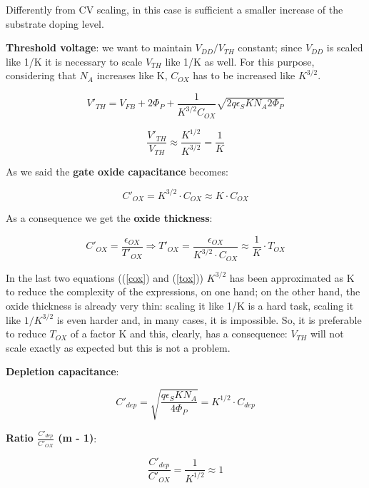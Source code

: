 \documentclass[a4paper, 12pt, twoside, openright]{report}
\begin{document}
Differently from CV scaling, in this case is sufficient a smaller increase of the substrate doping level.

\textbf{Threshold voltage}: we want to maintain $V_{DD}/V_{TH}$ constant; since $V_{DD}$ is scaled like 1/K it is necessary to scale $V_{TH}$ like 1/K as well. For this purpose, considering that $N_{A}$ increases like K, $C_{OX}$ has to be increased like $K^{3/2}$.

	\begin{equation}
	V'_{TH} = V_{FB} + 2\Phi_P + \frac{1}{K^{3/2} C_{OX}} \sqrt{2q \epsilon_S K N_A 2\Phi_P}
	\end{equation}
	
	\begin{equation}
	\frac{V'_{TH}}{V_{TH}} \approx \frac{K^{1/2}} {K^{3/2}} = \frac{1}{K}
	\end{equation}

As we said the \textbf{gate oxide capacitance} becomes:

	\begin{equation}
	C'_{OX} = K^{3/2} \cdot C_{OX}  \approx K \cdot C_{OX}
	\label{cox}
	\end{equation}

As a consequence we get the \textbf{oxide thickness}:

	\begin{equation}
	C'_{OX} = \frac{\epsilon_{OX}}{T'_{OX}} \Rightarrow T'_{OX} = \frac{\epsilon_{OX}}{K^{3/2} \cdot C_{OX}} \approx \frac{1}{K} \cdot T_{OX}
	\label{tox}
	\end{equation}

In the last two equations ((\ref{cox}) and (\ref{tox})) $K^{3/2}$ has been approximated as K to reduce the complexity of the expressions, on one hand; on the other hand, the oxide thickness is already very thin: scaling it like 1/K is a hard task, scaling it like $1/K^{3/2}$ is even harder and, in many cases, it is impossible. So, it is preferable to reduce $T_{OX}$ of a factor K and this, clearly, has a consequence: $V_{TH}$ will not scale exactly as expected but this is not a problem.

\textbf{Depletion capacitance}:

	\begin{equation}
	C'_{dep} = \sqrt{\frac{q \epsilon_S K N_A}{4 \Phi_P}} = K^{1/2} \cdot C_{dep} 
	\label{}
	\end{equation}

\textbf{Ratio $\frac{C'_{dep}}{C'_{OX} }$ (m - 1)}:

	\begin{equation}
	\frac{C'_{dep}}{C'_{OX}} = \frac{1}{K^{1/2}} \approx 1
	\label{}
	\end{equation}
\end{document}
